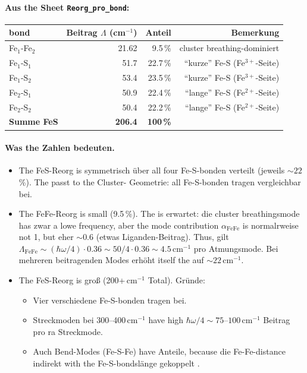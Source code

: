 \documentclass[11pt,a4paper,twoside]{article}
\theoremstyle{remark}
\begin{document}
\paragraph{Aus the Sheet \texttt{Reorg\_pro\_bond}:}
\begin{center}
\begin{tabular}{lrrr}
  \toprule
  \textbf{bond} & \textbf{Beitrag $\Lambda$ (cm$^{-1}$)} & \textbf{Anteil} & \textbf{Bemerkung} \\
  \midrule
  Fe$_1$-Fe$_2$       &  21.62 & 9.5\,\%  & cluster breathing-dominiert \\
  Fe$_1$-S$_1$       &  51.7 & 22.7\,\% & "`kurze"' Fe-S (Fe$^{3+}$-Seite) \\
  Fe$_1$-S$_2$       &  53.4 & 23.5\,\% & "`kurze"' Fe-S (Fe$^{3+}$-Seite) \\
  Fe$_2$-S$_1$       &  50.9 & 22.4\,\% & "`lange"' Fe-S (Fe$^{2+}$-Seite) \\
  Fe$_2$-S$_2$       &  50.4 & 22.2\,\% & "`lange"' Fe-S (Fe$^{2+}$-Seite) \\
  \midrule
  \textbf{Summe FeS}  & \textbf{206.4} & \textbf{100\,\%} & \\
  \bottomrule
\end{tabular}
\end{center}

\paragraph{Was the Zahlen bedeuten.}
\begin{itemize}\setlength{\itemsep}{0pt}
  \item The FeS-Reorg is symmetrisch \"uber all four Fe-S-bonden
        verteilt (jeweils $\sim 22$\,\%). The passt to the Cluster-
        Geometrie: all Fe-S-bonden tragen vergleichbar bei.
  \item The FeFe-Reorg is small (9.5\,\%). The is erwartet: die
        cluster breathingsmode has zwar a lowe frequency, aber
        the mode contribution $\alpha_\text{FeFe}$ is normalrweise
        not 1, but eher $\sim 0.6$ (etwas Liganden-Beitrag).
        Thus, gilt $\Lambda_\text{FeFe} \sim
        (\hbar\omega/4)\cdot 0.36 \sim 50/4 \cdot 0.36 \sim
        4.5$\,cm$^{-1}$ pro Atmungsmode. Bei mehreren beitragenden
        Modes erh\"oht itself the auf $\sim 22$\,cm$^{-1}$.
  \item The FeS-Reorg is gro{\ss} (200+\,cm$^{-1}$ Total). Gr\"unde:
        \begin{itemize}
          \item Vier verschiedene Fe-S-bonden tragen bei.
          \item Streckmoden bei 300--400\,cm$^{-1}$ have high
                $\hbar\omega/4 \sim 75$--$100$\,cm$^{-1}$ Beitrag pro
                ra Streckmode.
          \item Auch Bend-Modes (Fe-S-Fe) have Anteile, because die
                Fe-Fe-distance indirekt with the Fe-S-bondsl\"ange
                gekoppelt .
        \end{itemize}
\end{itemize}
\end{document}
